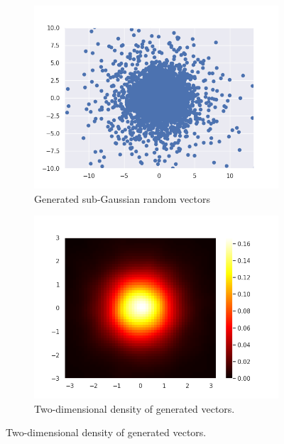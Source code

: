 \documentclass{article}
\begin{document}
	\begin{figure}\label{dwa}
		\centering
		\begin{subfigure}[H]{0.49\textwidth}
			\centering
			\includegraphics[width=\textwidth]{images/ex_2_alpha_stable_vector_simulation_sub_gaussian_SaS_catter}
			\caption{Generated sub-Gaussian random vectors}\label{4}
		\end{subfigure}
		\hfill
		\begin{subfigure}[H]{0.49\textwidth}
			\centering
			\includegraphics[width=\textwidth]{images/ex_2_alpha_stable_vector_simulation_sub_gaussian_SaS_heatmap}
			\caption{Two-dimensional density of generated vectors.}\label{5}
		\end{subfigure}
	\end{figure}
	
\end{document}
